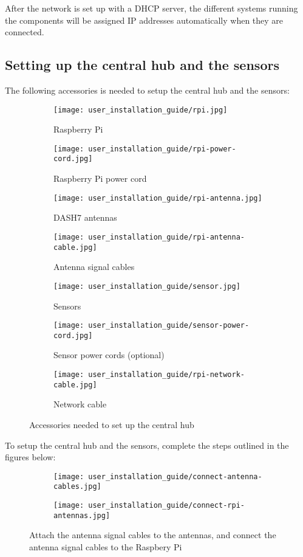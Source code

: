 \documentclass[../document.tex]{subfiles}
\begin{document}
After the network is set up with a DHCP server, the different systems running the components will be assigned IP addresses automatically when they are connected.



\subsection{Setting up the central hub and the sensors}
The following accessories is needed to setup the central hub and the sensors:
\newcommand{\Imwidth}{0.40}
\begin{figure}[H]
	\centering
	\begin{subfigure}[h]{\Imwidth\textwidth}
		\texttt{[image: user\_installation\_guide/rpi.jpg]}
		\caption{Raspberry Pi}	
	\end{subfigure}
	\quad
	\begin{subfigure}[h]{\Imwidth\textwidth}
		\texttt{[image: user\_installation\_guide/rpi-power-cord.jpg]}
		\caption{Raspberry Pi power cord}	
	\end{subfigure}
	\quad
	\begin{subfigure}[h]{\Imwidth\textwidth}
		\texttt{[image: user\_installation\_guide/rpi-antenna.jpg]}
		\caption{DASH7 antennas}	
	\end{subfigure}
	\quad
	\begin{subfigure}[h]{\Imwidth\textwidth}
		\texttt{[image: user\_installation\_guide/rpi-antenna-cable.jpg]}
		\caption{Antenna signal cables}	
	\end{subfigure}
	\quad
	\begin{subfigure}[h]{\Imwidth\textwidth}
		\texttt{[image: user\_installation\_guide/sensor.jpg]}
		\caption{Sensors}	
	\end{subfigure}
	\quad
	\begin{subfigure}[h]{\Imwidth\textwidth}
		\texttt{[image: user\_installation\_guide/sensor-power-cord.jpg]}
		\caption{Sensor power cords (optional)}	
	\end{subfigure}
	\quad
	\begin{subfigure}[h]{\Imwidth\textwidth}
		\texttt{[image: user\_installation\_guide/rpi-network-cable.jpg]}
		\caption{Network cable}	
	\end{subfigure}
	\caption{Accessories needed to set up the central hub}
\end{figure}

To setup the central hub and the sensors, complete the steps outlined in the figures below:
\begin{figure}[H]
	\centering
	\begin{subfigure}[h]{0.48\textwidth}
		\texttt{[image: user\_installation\_guide/connect-antenna-cables.jpg]}
	\end{subfigure}
	\quad
	\begin{subfigure}[h]{0.48\textwidth}
		\texttt{[image: user\_installation\_guide/connect-rpi-antennas.jpg]}
	\end{subfigure}
	\caption{Attach the antenna signal cables to the antennas, and connect the antenna signal cables to the Raspbery Pi}
\end{figure}
\end{document}
